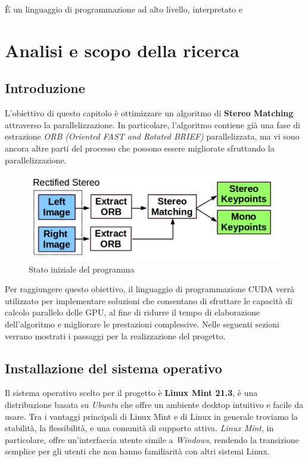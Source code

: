 \documentclass[12pt,a4paper]{report}
\begin{document}
È un linguaggio di programmazione ad alto livello, interpretato e

\chapter{Analisi e scopo della ricerca}

\section{Introduzione}

L'obiettivo di questo capitolo è ottimizzare un algoritmo di \textbf{Stereo Matching} attraverso la parallelizzazione. In particolare, l'algoritmo contiene già una fase di estrazione \textit{ORB (Oriented FAST and Rotated BRIEF)} parallelizzata, ma vi sono ancora altre parti del processo che possono essere migliorate sfruttando la parallelizzazione.

\begin{figure}[h]
    \centering
    \includegraphics[width=0.7\linewidth]{img/start_point_opt.png}
    \caption{Stato iniziale del programma \cite{ORB_SLAM_2}}
\end{figure}


Per raggiungere questo obiettivo, il linguaggio di programmazione CUDA verrà utilizzato per implementare soluzioni che consentano di sfruttare le capacità di calcolo parallelo delle GPU, al fine di ridurre il tempo di elaborazione dell'algoritmo e migliorare le prestazioni complessive.
Nelle seguenti sezioni verrano mostrati i passaggi per la realizzazione del progetto.


\section{Installazione del sistema operativo}

Il sistema operativo scelto per il progetto è \textbf{Linux Mint 21.3}, è una distribuzione basata su \textit{Ubuntu} che offre un ambiente desktop intuitivo e facile da usare. Tra i vantaggi principali di Linux Mint e di Linux in generale troviamo la stabilità, la flessibilità, e una comunità di supporto attiva. \textit{Linux Mint}, in particolare, offre un'interfaccia utente simile a \textit{Windows}, rendendo la transizione semplice per gli utenti che non hanno familiarità con altri sistemi Linux.
\end{document}
